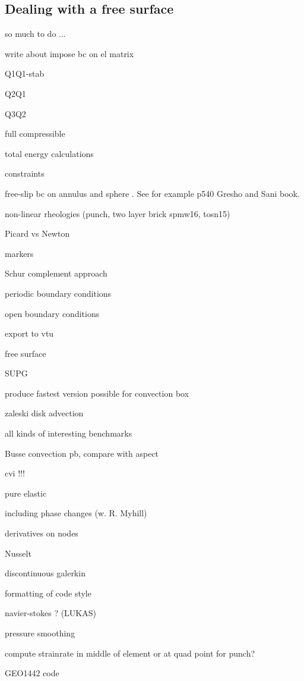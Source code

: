 \documentclass[a4paper]{article}
\begin{document}
\subsection{Dealing with a free surface}









\newpage
so much to do ... 

write about impose bc on el matrix

Q1Q1-stab

Q2Q1 

Q3Q2

full compressible 

total energy calculations

constraints

free-slip bc on annulus and sphere . See for example p540 Gresho and Sani book.

non-linear rheologies (punch, two layer brick spmw16, tosn15) 

Picard vs Newton

markers

Schur complement approach

periodic boundary conditions

open boundary conditions

export to vtu 

free surface 

SUPG

produce fastest version possible for convection box

zaleski disk advection

all kinds of interesting benchmarks

Busse convection pb, compare with aspect 

cvi !!!

pure elastic 

including phase changes (w. R. Myhill)

derivatives on nodes

Nusselt

discontinuous galerkin

formatting of code style

navier-stokes ? (LUKAS)

pressure smoothing

compute strainrate in middle of element or at quad point for punch?

GEO1442 code 
\end{document}
